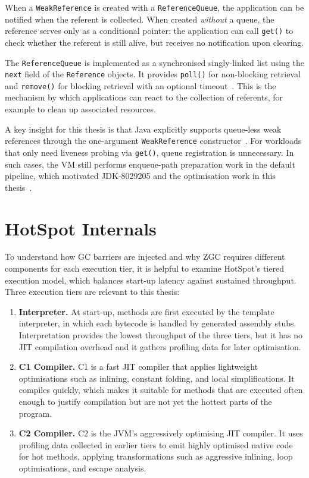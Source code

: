 When a \texttt{WeakReference} is created with a \texttt{ReferenceQueue}, the application can be notified when the referent is collected. When created \emph{without} a queue, the reference serves only as a conditional pointer: the application can call \texttt{get()} to check whether the referent is still alive, but receives no notification upon clearing.

The \texttt{ReferenceQueue} is implemented as a synchronised singly-linked list using the \texttt{next} field of the \texttt{Reference} objects. It provides \texttt{poll()} for non-blocking retrieval and \texttt{remove()} for blocking retrieval with an optional timeout~\cite{openjdk-referencequeue-java}. This is the mechanism by which applications can react to the collection of referents, for example to clean up associated resources.

A key insight for this thesis is that Java explicitly supports queue-less weak references through the one-argument \texttt{WeakReference} constructor~\cite{openjdk-weakreference-java}. For workloads that only need liveness probing via \texttt{get()}, queue registration is unnecessary. In such cases, the VM still performs enqueue-path preparation work in the default pipeline, which motivated JDK-8029205 and the optimisation work in this thesis~\cite{JDK-8029205,openjdk-reference-java,openjdk-zreferenceprocessor-cpp}.



\section{HotSpot Internals}
\label{sec:bg-jvm}

To understand how \ac{GC} barriers are injected and why \ac{ZGC} requires different components for each execution tier, it is helpful to examine HotSpot's tiered execution model, which balances start-up latency against sustained throughput. Three execution tiers are relevant to this thesis:

\begin{enumerate}
    \item \textbf{Interpreter.} At start-up, methods are first executed by the template interpreter, in which each bytecode is handled by generated assembly stubs. Interpretation provides the lowest throughput of the three tiers, but it has no \ac{JIT} compilation overhead and it gathers profiling data for later optimisation.

    \item \textbf{C1 Compiler.} C1 is a fast \ac{JIT} compiler that applies lightweight optimisations such as inlining, constant folding, and local simplifications. It compiles quickly, which makes it suitable for methods that are executed often enough to justify compilation but are not yet the hottest parts of the program.

    \item \textbf{C2 Compiler.} C2 is the \ac{JVM}'s aggressively optimising \ac{JIT} compiler. It uses profiling data collected in earlier tiers to emit highly optimised native code for hot methods, applying transformations such as aggressive inlining, loop optimisations, and escape analysis.
\end{enumerate}

